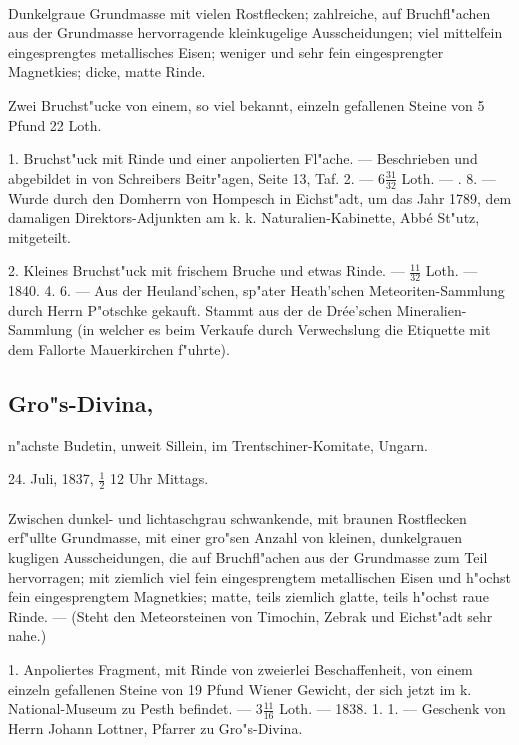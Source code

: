 \documentclass[a4paper, 11pt, oneside, polutonikogreek, german]{article}
\begin{document}
\paragraph{}
Dunkelgraue Grundmasse mit vielen Rostflecken; zahlreiche, auf Bruchfl"achen aus der Grundmasse hervorragende kleinkugelige Ausscheidungen; viel mittelfein eingesprengtes metallisches Eisen; weniger und sehr fein eingesprengter Magnetkies; dicke, matte Rinde.

Zwei Bruchst"ucke von einem, so viel bekannt, einzeln gefallenen Steine von 5 Pfund 22 Loth.

1. Bruchst"uck mit Rinde und einer anpolierten Fl"ache. --- Beschrieben und abgebildet in von Schreibers Beitr"agen, Seite 13, Taf. 2. --- $6\frac{31}{32}$ Loth. --- . 8. --- Wurde durch den Domherrn von Hompesch in Eichst"adt, um das Jahr 1789, dem damaligen Direktors-Adjunkten am k. k. Naturalien-Kabinette, Abbé St"utz, mitgeteilt.

2. Kleines Bruchst"uck mit frischem Bruche und etwas Rinde. --- $\frac{11}{32}$ Loth. --- 1840. 4. 6. --- Aus der Heuland'schen, sp"ater Heath'schen Meteoriten-Sammlung durch Herrn P"otschke gekauft. Stammt aus der de Drée'schen Mineralien-Sammlung (in welcher es beim Verkaufe durch Verwechslung die Etiquette mit dem Fallorte Mauerkirchen f"uhrte).
\subsection[Gro"s-Divina.]{Gro"s-Divina,}
\begin{center}
\small
n"achste Budetin, unweit Sillein, im Trentschiner-Komitate, Ungarn.

24. Juli, 1837, $\frac{1}{2}$ 12 Uhr Mittags.
\end{center}
\paragraph{}
Zwischen dunkel- und lichtaschgrau schwankende, mit braunen Rostflecken erf"ullte Grundmasse, mit einer gro"sen Anzahl von kleinen, dunkelgrauen kugligen Ausscheidungen, die auf Bruchfl"achen aus der Grundmasse zum Teil hervorragen; mit ziemlich viel fein eingesprengtem metallischen Eisen und h"ochst fein eingesprengtem Magnetkies; matte, teils ziemlich glatte, teils h"ochst raue Rinde. --- (Steht den Meteorsteinen von Timochin, Zebrak und Eichst"adt sehr nahe.)

1. Anpoliertes Fragment, mit Rinde von zweierlei Beschaffenheit, von einem einzeln gefallenen Steine von 19 Pfund Wiener Gewicht, der sich jetzt im k. National-Museum zu Pesth befindet. --- $3\frac{11}{16}$ Loth. --- 1838. 1. 1. --- Geschenk von Herrn Johann Lottner, Pfarrer zu Gro"s-Divina.
\end{document}
